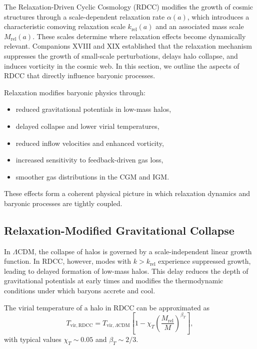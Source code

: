 \documentclass[11pt,a4paper]{article}
\begin{document}
The Relaxation-Driven Cyclic Cosmology (RDCC) modifies the growth of cosmic structures
through a scale-dependent relaxation rate $\alpha(a)$, which introduces a characteristic
comoving relaxation scale $k_{\mathrm{rel}}(a)$ and an associated mass scale $M_{\mathrm{rel}}(a)$.
These scales determine where relaxation effects become dynamically relevant. Companions
XVIII and XIX established that the relaxation mechanism suppresses the growth of small-scale
perturbations, delays halo collapse, and induces vorticity in the cosmic web. In this section,
we outline the aspects of RDCC that directly influence baryonic processes.

Relaxation modifies baryonic physics through:
\begin{itemize}
\item reduced gravitational potentials in low-mass halos,
\item delayed collapse and lower virial temperatures,
\item reduced inflow velocities and enhanced vorticity,
\item increased sensitivity to feedback-driven gas loss,
\item smoother gas distributions in the CGM and IGM.
\end{itemize}

These effects form a coherent physical picture in which relaxation dynamics and baryonic
processes are tightly coupled.

\subsection{Relaxation-Modified Gravitational Collapse}

In $\Lambda$CDM, the collapse of halos is governed by a scale-independent linear growth
function. In RDCC, however, modes with $k > k_{\mathrm{rel}}$ experience suppressed growth,
leading to delayed formation of low-mass halos. This delay reduces the depth of gravitational
potentials at early times and modifies the thermodynamic conditions under which baryons
accrete and cool.

The virial temperature of a halo in RDCC can be approximated as
\begin{equation}
T_{\mathrm{vir,RDCC}}
=
T_{\mathrm{vir},\Lambda\mathrm{CDM}}
\left[
1
-
\chi_{T}
\left(
\frac{M_{\mathrm{rel}}}{M}
\right)^{\beta_{T}}
\right],
\end{equation}
with typical values $\chi_{T} \sim 0.05$ and $\beta_{T} \sim 2/3$.
\end{document}
